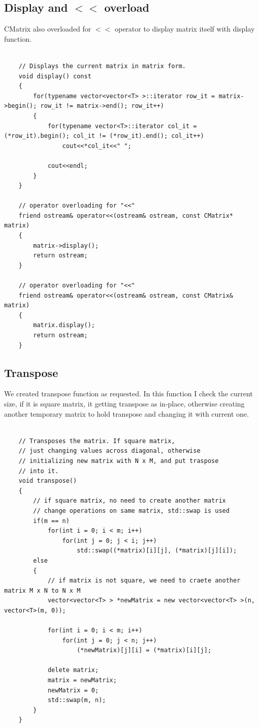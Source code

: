 \documentclass{article}
\begin{document}
	
	\subsection{Display and $<<$ overload}
	CMatrix also overloaded for $<<$ operator to display matrix itself with display function.
	
	\begin{lstlisting}[label=CMatrixDisplay, caption=CMatrix Display]
	
    // Displays the current matrix in matrix form.
    void display() const
    {
        for(typename vector<vector<T> >::iterator row_it = matrix->begin(); row_it != matrix->end(); row_it++)
        {
            for(typename vector<T>::iterator col_it = (*row_it).begin(); col_it != (*row_it).end(); col_it++)
                cout<<*col_it<<" ";

            cout<<endl;
        }
    }

    // operator overloading for "<<"
    friend ostream& operator<<(ostream& ostream, const CMatrix* matrix)
    {
        matrix->display();
        return ostream;
    }

    // operator overloading for "<<"
    friend ostream& operator<<(ostream& ostream, const CMatrix& matrix)
    {
        matrix.display();
        return ostream;
    }

	\end{lstlisting}
	
	
	\subsection{Transpose}
	We created transpose function as requested. In this function I check the current size, if it is square matrix, it getting transpose as in-place, otherwise creating another temporary matrix to hold transpose and changing it with current one.
	
		\begin{lstlisting}[label=CMatrixTranspose, caption=CMatrix Transpose]
	
    // Transposes the matrix. If square matrix,
    // just changing values across diagonal, otherwise
    // initializing new matrix with N x M, and put traspose
    // into it.
    void transpose()
    {
        // if square matrix, no need to create another matrix
        // change operations on same matrix, std::swap is used
        if(m == n)
            for(int i = 0; i < m; i++)
                for(int j = 0; j < i; j++)
                    std::swap((*matrix)[i][j], (*matrix)[j][i]);
        else
        {
            // if matrix is not square, we need to craete another matrix M x N to N x M
            vector<vector<T> > *newMatrix = new vector<vector<T> >(n, vector<T>(m, 0));

            for(int i = 0; i < m; i++)
                for(int j = 0; j < n; j++)
                    (*newMatrix)[j][i] = (*matrix)[i][j];

            delete matrix;
            matrix = newMatrix;
            newMatrix = 0;
            std::swap(m, n);
        }
    }
	\end{lstlisting}
	
\end{document}
